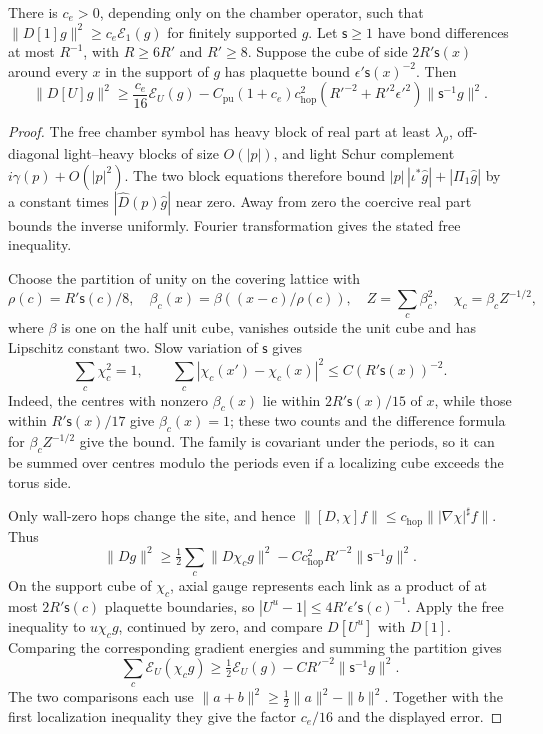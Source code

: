 \documentclass[11pt,letterpaper,reqno]{amsart}
\makeatletter
\theoremstyle{definition}
\newcommand{\ms@minorstart}{%
  \pushQED{\qed}\renewcommand{\qedsymbol}{$\blacksquare$}}
\newenvironment{lemma}[1][]{\ms@minorstart\ms@lemma[#1]}
  {\popQED\endms@lemma}
\theoremstyle{remark}
\makeatother
\begin{document}
\begin{lemma}[Localized ellipticity]\label{C-397-26}
There is $c_e>0$, depending only on the chamber operator, such that
$\|D[1]g\|^2\ge c_e\mathcal E_1(g)$ for finitely supported $g$.
Let $\mathsf s\ge1$ have bond differences at most $R^{-1}$, with
$R\ge6R'$ and $R'\ge8$.  Suppose the cube of side
$2R'\mathsf s(x)$ around every $x$ in the support of $g$ has
plaquette bound $\epsilon'\mathsf s(x)^{-2}$.  Then
\[
 \|D[U]g\|^2\ge\frac{c_e}{16}\mathcal E_U(g)
 -C_{\mathrm{pu}}(1+c_e)c_{\mathrm{hop}}^2
        (R'^{-2}+R'^2\epsilon'^2)\|\mathsf s^{-1}g\|^2.
\]
\end{lemma}

\begin{proof}
The free chamber symbol has heavy block of real part at least
$\lambda_\rho$, off-diagonal light--heavy blocks of size
$O(|p|)$, and light Schur complement $i\gamma(p)+O(|p|^2)$.
The two block equations therefore bound
$|p|\,|\iota^*\hat g|+|\Pi_1\hat g|$ by a constant times
$|\hat D(p)\hat g|$ near zero.  Away from zero the coercive
real part bounds the inverse uniformly.  Fourier transformation
gives the stated free inequality.

Choose the partition of unity on the covering lattice with
\[
 \rho(c)=R'\mathsf s(c)/8,\quad
 \beta_c(x)=\beta((x-c)/\rho(c)),\quad
 Z=\sum_c\beta_c^2,\quad\chi_c=\beta_cZ^{-1/2},
\]
where $\beta$ is one on the half unit cube, vanishes outside the
unit cube and has Lipschitz constant two.  Slow variation of
$\mathsf s$ gives
\[
 \sum_c\chi_c^2=1,\qquad
 \sum_c|\chi_c(x')-\chi_c(x)|^2
                    \le C(R'\mathsf s(x))^{-2}.
\]
Indeed, the centres with nonzero $\beta_c(x)$ lie within
$2R'\mathsf s(x)/15$ of $x$, while those within
$R'\mathsf s(x)/17$ give $\beta_c(x)=1$; these two counts and
the difference formula for $\beta_cZ^{-1/2}$ give the bound.
The family is covariant under the periods, so it can be summed
over centres modulo the periods even if a localizing cube exceeds
the torus side.

Only wall-zero hops change the site, and hence
$\|[D,\chi]f\|\le c_{\mathrm{hop}}
\||\nabla\chi|^\sharp f\|$.
Thus
\[
 \|Dg\|^2\ge\tfrac12\sum_c\|D\chi_cg\|^2
                 -Cc_{\mathrm{hop}}^2R'^{-2}
                                  \|\mathsf s^{-1}g\|^2.
\]
On the support cube of $\chi_c$, axial gauge represents each link
as a product of at most $2R'\mathsf s(c)$ plaquette boundaries,
so $|U^u-1|\le4R'\epsilon'\mathsf s(c)^{-1}$.
Apply the free inequality to $u\chi_cg$, continued by zero, and
compare $D[U^u]$ with $D[1]$.  Comparing the corresponding gradient
energies and summing the partition gives
\[
 \sum_c\mathcal E_U(\chi_cg)
 \ge\tfrac12\mathcal E_U(g)-CR'^{-2}\|\mathsf s^{-1}g\|^2.
\]
The two comparisons each use
$\|a+b\|^2\ge\frac12\|a\|^2-\|b\|^2$.
Together with the first localization inequality they give the
factor $c_e/16$ and the displayed error.
\end{proof}
\end{document}
